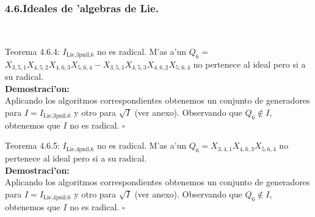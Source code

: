 \documentclass[10pt]{beamer}
\begin{document}
\begin{frame}
\frametitle{4.6.Ideales de 'algebras de Lie.}\\
\begin{block}{Teorema 4.6.4:}
$I_{\text{Lie,3pnil,}6}$ no es radical. M'as a'un $Q_{6}=$\\
$X_{3,5,1}X_{4,5,2}X_{4,6,3}X_{5,6,4}-X_{3,5,1}X_{4,5,3}X_{4,6,2}X_{5,6,4}$ no pertenece al ideal pero si a su radical.\\
\textbf{Demostraci'on:}\\
Aplicando los algoritmos correspondientes obtenemos un conjunto de generadores para $I=I_{\text{Lie,3pnil,}6}$ y otro para $\sqrt{I}$ (ver anexo). Observando que $Q_6 \not \in I$, obtenemos que $I$ no es radical. \hfill $\square$\\
\end{block}
\begin{block}{Teorema 4.6.5:}
$I_{\text{Lie,4pnil,}6}$ no es radical. M'as a'un $Q_{6}=X_{3,4,1}X_{4,6,3}X_{5,6,4}$ no pertenece al ideal pero si a su radical.\\
\textbf{Demostraci'on:}\\
Aplicando los algoritmos correspondientes obtenemos un conjunto de generadores para $I=I_{\text{Lie,4pnil,}6}$ y otro para $\sqrt{I}$ (ver anexo). Observando que $Q_6 \not \in I$, obtenemos que $I$ no es radical. \hfill $\square$\\
\end{block}
\end{frame}
\end{document}

